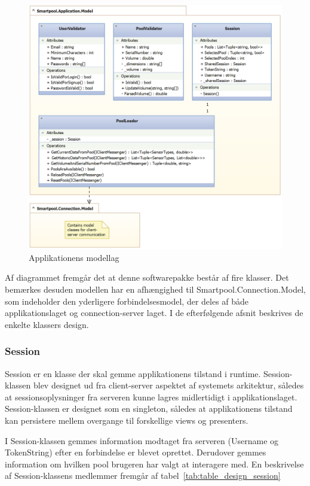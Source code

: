 \begin{figure}
	\centering
	\includegraphics[width=1.0\linewidth]{figs/design/application_model_cd}
	\caption{Applikationens modellag}
	\label{fig:application_model_cd}
\end{figure}

Af diagrammet fremgår det at denne softwarepakke består af fire klasser. Det bemærkes desuden modellen har en afhængighed til Smartpool.Connection.Model, som indeholder den yderligere forbindelsesmodel, der deles af både applikationslaget og connection-server laget. I de efterfølgende afsnit beskrives de enkelte klassers design.

\subsubsection{Session}

Session er en klasse der skal gemme applikationens tilstand i runtime. Session-klassen blev designet ud fra client-server aspektet af systemets arkitektur, således at sessionsoplysninger fra serveren kunne lagres midlertidigt i applikationslaget. Session-klassen er designet som en singleton, således at applikationens tilstand kan persistere mellem overgange til forskellige views og presenters.

I Session-klassen gemmes information modtaget fra serveren (Username og TokenString) efter en forbindelse er blevet oprettet. Derudover gemmes information om hvilken pool brugeren har valgt at interagere med. En beskrivelse af Session-klassens medlemmer fremgår af tabel~\ref{tab:table_design_session}

